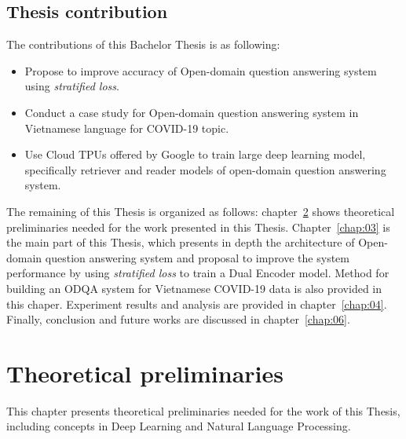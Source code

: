 \documentclass[12pt, sort&compress]{report}
\begin{document}
\section{Thesis contribution}
\label{sec:1.3}
The contributions of this Bachelor Thesis is as following:
\begin{itemize}
	\item Propose to improve accuracy of Open-domain question answering system using \textit{stratified loss}.
	\item Conduct a case study for Open-domain question answering system in Vietnamese language for COVID-19 topic.
	\item Use Cloud TPUs offered by Google to train large deep learning model, specifically retriever and reader models of open-domain question answering system.
\end{itemize}
\par The remaining of this Thesis is organized as follows: chapter~\ref{chap:02} shows theoretical preliminaries needed for the work presented in this Thesis. Chapter~\ref{chap:03} is the main part of this Thesis, which presents in depth the architecture of Open-domain question answering system and proposal to improve the system performance by using \textit{stratified loss} to train a Dual Encoder model. Method for building an ODQA system for Vietnamese COVID-19 data is also provided in this chaper. Experiment results and analysis are provided in chapter~\ref{chap:04}. Finally, conclusion and future works are discussed in chapter~\ref{chap:06}.
\chapter{Theoretical preliminaries}
\label{chap:02}
This chapter presents theoretical preliminaries needed for the work of this Thesis, including concepts in Deep Learning and Natural Language Processing.
\end{document}
